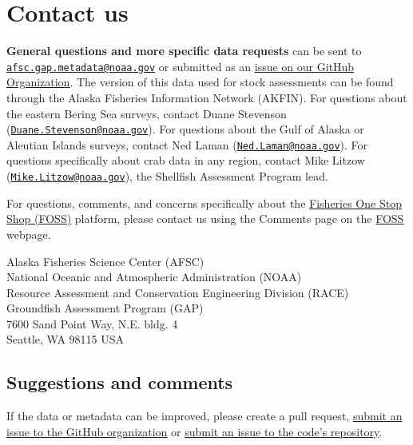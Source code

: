 \documentclass[
  letterpaper,
  oneside,
  open=any]{scrbook}
\begin{document}
\hypertarget{contact-us}{%
\chapter{Contact us}\label{contact-us}}

\textbf{General questions and more specific data requests} can be sent
to
\href{mailto:afsc.gap.metadata@noaa.gov}{\nolinkurl{afsc.gap.metadata@noaa.gov}}
or submitted as an
\href{https://github.com/afsc-gap-products/data-requests}{issue on our
GitHub Organization}. The version of this data used for stock
assessments can be found through the Alaska Fisheries Information
Network (AKFIN). For questions about the eastern Bering Sea surveys,
contact Duane Stevenson
(\href{mailto:Duane.Stevenson@noaa.gov}{\nolinkurl{Duane.Stevenson@noaa.gov}}).
For questions about the Gulf of Alaska or Aleutian Islands surveys,
contact Ned Laman
(\href{mailto:Ned.Laman@noaa.gov}{\nolinkurl{Ned.Laman@noaa.gov}}). For
questions specifically about crab data in any region, contact Mike
Litzow
(\href{mailto:Mike.Litzow@noaa.gov}{\nolinkurl{Mike.Litzow@noaa.gov}}),
the Shellfish Assessment Program lead.

For questions, comments, and concerns specifically about the
\href{https://www.fisheries.noaa.gov/foss}{Fisheries One Stop Shop
(FOSS)} platform, please contact us using the Comments page on the
\href{https://www.fisheries.noaa.gov/foss}{FOSS} webpage.

Alaska Fisheries Science Center (AFSC)\\
National Oceanic and Atmospheric Administration (NOAA)\\
Resource Assessment and Conservation Engineering Division (RACE)\\
Groundfish Assessment Program (GAP)\\
7600 Sand Point Way, N.E. bldg. 4\\
Seattle, WA 98115 USA

\hypertarget{suggestions-and-comments}{%
\section{Suggestions and comments}\label{suggestions-and-comments}}

If the data or metadata can be improved, please create a pull request,
\href{https://github.com/afsc-gap-products/data-requests/issues}{submit
an issue to the GitHub organization} or
\href{https://github.com/afsc-gap-products/gap_products/issues}{submit
an issue to the code's repository}.


\backmatter
\end{document}
